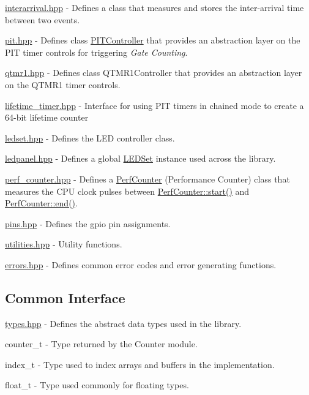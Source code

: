 \begin{DoxyItemize}
\item {\ttfamily \hyperlink{interarrival_8hpp}{interarrival.\+hpp}} -\/ Defines a class that measures and stores the inter-\/arrival time between two events.
\item {\ttfamily \hyperlink{pit_8hpp}{pit.\+hpp}} -\/ Defines {\ttfamily class \hyperlink{classPITController}{P\+I\+T\+Controller}} that provides an abstraction layer on the P\+IT timer controls for triggering {\itshape Gate Counting}.
\item {\ttfamily \hyperlink{qtmr1_8hpp}{qtmr1.\+hpp}} -\/ Defines \textquotesingle{}class Q\+T\+M\+R1\+Controller\textquotesingle{} that provides an abstraction layer on the Q\+T\+M\+R1 timer controls.
\item {\ttfamily \hyperlink{lifetime__timer_8hpp}{lifetime\+\_\+timer.\+hpp}} -\/ Interface for using P\+IT timers in chained mode to create a 64-\/bit lifetime counter
\item {\ttfamily \hyperlink{ledset_8hpp}{ledset.\+hpp}} -\/ Defines the L\+ED controller class.
\item {\ttfamily \hyperlink{ledpanel_8hpp}{ledpanel.\+hpp}} -\/ Defines a global {\ttfamily \hyperlink{classLEDSet}{L\+E\+D\+Set}} instance used across the library.
\item {\ttfamily \hyperlink{perf__counter_8hpp}{perf\+\_\+counter.\+hpp}} -\/ Defines a {\ttfamily \hyperlink{classPerfCounter}{Perf\+Counter}} (Performance Counter) class that measures the C\+PU clock pulses between {\ttfamily \hyperlink{classPerfCounter_a5fdd73c1d604decd6dc745aada8092d1}{Perf\+Counter\+::start()}} and {\ttfamily \hyperlink{classPerfCounter_ab5d9f05bb15139451eaa857989ed8bd8}{Perf\+Counter\+::end()}}.
\item {\ttfamily \hyperlink{pins_8hpp}{pins.\+hpp}} -\/ Defines the gpio pin assignments.
\item {\ttfamily \hyperlink{utilities_8hpp}{utilities.\+hpp}} -\/ Utility functions.
\item {\ttfamily \hyperlink{errors_8hpp}{errors.\+hpp}} -\/ Defines common error codes and error generating functions.
\end{DoxyItemize}

\subsection*{Common Interface}


\begin{DoxyItemize}
\item {\ttfamily \hyperlink{types_8hpp}{types.\+hpp}} -\/ Defines the abstract data types used in the library.
\begin{DoxyItemize}
\item {\ttfamily counter\+\_\+t} -\/ Type returned by the Counter module.
\item {\ttfamily index\+\_\+t} -\/ Type used to index arrays and buffers in the implementation.
\item float\+\_\+t -\/ Type used commonly for floating types.
\end{DoxyItemize}
\end{DoxyItemize}


